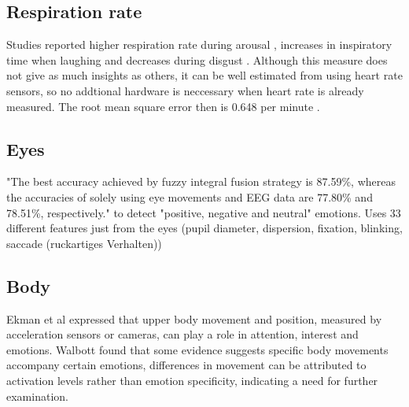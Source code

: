 \subsection{Respiration rate}
Studies reported higher respiration rate during arousal \cite{homma2008breathing}, increases in inspiratory time when laughing and decreases during disgust \cite{boiten1998effects}. Although this measure does not give as much insights as others, it can be well estimated from using heart rate sensors, so no addtional hardware is neccessary when heart rate is already measured. The root mean square error then is 0.648 per minute \cite{natarajan2021measurement}.

\subsection{Eyes}
"The best accuracy achieved by fuzzy integral fusion strategy is 87.59\%, whereas the accuracies of solely using eye movements and EEG data are 77.80\% and 78.51\%, respectively." to detect "positive, negative and neutral" emotions. Uses 33 different features just from the eyes (pupil diameter, dispersion, fixation, blinking, saccade (ruckartiges Verhalten))\cite{lu15combining}

\subsection{Body}
Ekman et al expressed that upper body movement and position, measured by acceleration sensors or cameras, can play a role in attention, interest and emotions\cite{ekman2012social}. Walbott \cite{wallbott1998bodily} found that some evidence suggests specific body movements accompany certain emotions, differences in movement can be attributed to activation levels rather than emotion specificity, indicating a need for further examination.

